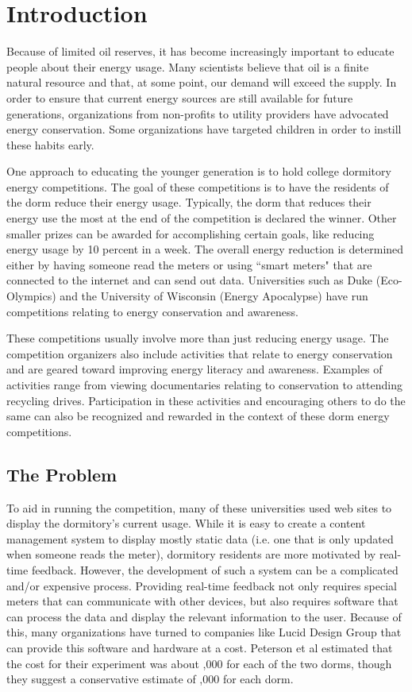 \chapter{Introduction}
Because of limited oil reserves, it has become increasingly important to educate people about their energy usage.  Many scientists believe that oil is a finite natural resource and that, at some point, our demand will exceed the supply\cite{peakoil}.  In order to ensure that current energy sources are still available for future generations, organizations from non-profits\cite{blueplanet} to utility providers\cite{heco} have advocated energy conservation.  Some organizations have targeted children in order to instill these habits early\cite{energyhog}.

One approach to educating the younger generation is to hold college dormitory energy competitions.  The goal of these competitions is to have the residents of the dorm reduce their energy usage.  Typically, the dorm that reduces their energy use the most at the end of the competition is declared the winner.  Other smaller prizes can be awarded for accomplishing certain goals, like reducing energy usage by 10 percent in a week.  The overall energy reduction is determined either by having someone read the meters or using ``smart meters" that are connected to the internet and can send out data.  Universities such as Duke (Eco-Olympics) and the University of Wisconsin (Energy Apocalypse) have run competitions relating to energy conservation and awareness. 

These competitions usually involve more than just reducing energy usage.  The competition organizers also include activities that relate to energy conservation and are geared toward improving energy literacy and awareness.  Examples of activities range from viewing documentaries relating to conservation to attending recycling drives.  Participation in these activities and encouraging others to do the same can also be recognized and rewarded in the context of these dorm energy competitions.

\section{The Problem}

To aid in running the competition, many of these universities used web sites to display the dormitory's current usage.  While it is easy to create a content management system to display mostly static data (i.e. one that is only updated when someone reads the meter), dormitory residents are more motivated by real-time feedback\cite{oberlin-feedback}.  However, the development of such a system can be a complicated and/or expensive process.  Providing real-time feedback not only requires special meters that can communicate with other devices, but also requires software that can process the data and display the relevant information to the user.  Because of this, many organizations have turned to companies like Lucid Design Group that can provide this software and hardware at a cost.  Peterson et al estimated that the cost for their experiment was about ,000 for each of the two dorms, though they suggest a conservative estimate of ,000 for each dorm.


